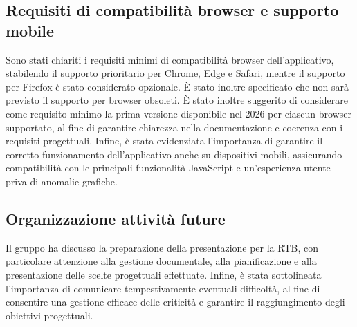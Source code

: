 \documentclass[10pt, letterpaper]{article}
\begin{document}
\subsection{Requisiti di compatibilità browser e supporto mobile}
Sono stati chiariti i requisiti minimi di compatibilità browser dell’applicativo, stabilendo il supporto prioritario per Chrome, Edge e Safari, mentre il supporto per Firefox è stato considerato opzionale. È stato inoltre specificato che non sarà previsto il supporto per browser obsoleti.
\noindent
È stato inoltre suggerito di considerare come requisito minimo la prima versione disponibile nel 2026 per ciascun browser supportato, al fine di garantire chiarezza nella documentazione e coerenza con i requisiti progettuali.
\noindent
Infine, è stata evidenziata l’importanza di garantire il corretto funzionamento dell’applicativo anche su dispositivi mobili, assicurando compatibilità con le principali funzionalità JavaScript e un’esperienza utente priva di anomalie grafiche.

\subsection{Organizzazione attività future}
Il gruppo ha discusso la preparazione della presentazione per la RTB, con particolare attenzione alla gestione documentale, alla pianificazione e alla presentazione delle scelte progettuali effettuate.
\noindent
Infine, è stata sottolineata l’importanza di comunicare tempestivamente eventuali difficoltà, al fine di consentire una gestione efficace delle criticità e garantire il raggiungimento degli obiettivi progettuali.






\makeDecisionTable





\makeTodoTable
\end{document}
